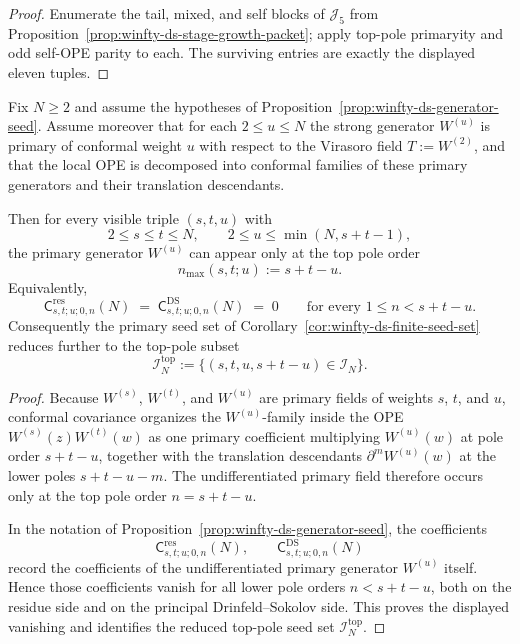 \begin{proof}
Enumerate the tail, mixed, and self blocks of $\mathcal{J}_5$ from Proposition~\ref{prop:winfty-ds-stage-growth-packet}; apply top-pole primaryity and odd self-OPE parity to each.  The surviving entries are exactly the displayed eleven tuples.
\end{proof}

\begin{proposition}
\label{prop:winfty-ds-primary-top-pole}
Fix $N \ge 2$ and assume the hypotheses of
Proposition~\ref{prop:winfty-ds-generator-seed}.  Assume moreover that
for each $2 \le u \le N$ the strong generator $W^{(u)}$ is primary of
conformal weight $u$ with respect to the Virasoro field
$T:=W^{(2)}$, and that the local OPE is decomposed into conformal
families of these primary generators and their translation
descendants.

Then for every visible triple $(s,t,u)$ with
\[
2 \le s \le t \le N,
\qquad
2 \le u \le \min(N,s+t-1),
\]
the primary generator $W^{(u)}$ can appear only at the top pole order
\[
n_{\max}(s,t;u):=s+t-u.
\]
Equivalently,
\[
\mathsf{C}^{\mathrm{res}}_{s,t;u;0,n}(N)
\;=\;
\mathsf{C}^{\mathrm{DS}}_{s,t;u;0,n}(N)
\;=\;0
\qquad\text{for every } 1\le n < s+t-u.
\]
Consequently the primary seed set of
Corollary~\ref{cor:winfty-ds-finite-seed-set} reduces further to the
top-pole subset
\[
\mathcal{I}_N^{\mathrm{top}}
:=\{(s,t,u,s+t-u)\in \mathcal{I}_N\}.
\]
\end{proposition}

\begin{proof}
Because $W^{(s)}$, $W^{(t)}$, and $W^{(u)}$ are primary fields of
weights $s$, $t$, and $u$, conformal covariance organizes the
$W^{(u)}$-family inside the OPE
$W^{(s)}(z)W^{(t)}(w)$ as one primary coefficient multiplying
$W^{(u)}(w)$ at pole order $s+t-u$, together with the translation
descendants $\partial^m W^{(u)}(w)$ at the lower poles
$s+t-u-m$.  The undifferentiated primary field therefore occurs only at
the top pole order $n=s+t-u$.

In the notation of
Proposition~\ref{prop:winfty-ds-generator-seed}, the coefficients
\[
\mathsf{C}^{\mathrm{res}}_{s,t;u;0,n}(N),
\qquad
\mathsf{C}^{\mathrm{DS}}_{s,t;u;0,n}(N)
\]
record the coefficients of the undifferentiated primary generator
$W^{(u)}$ itself.  Hence those coefficients vanish for all lower pole
orders $n<s+t-u$, both on the residue side and on the principal
Drinfeld--Sokolov side.  This proves the displayed vanishing and
identifies the reduced top-pole seed set $\mathcal{I}_N^{\mathrm{top}}$.
\end{proof}

